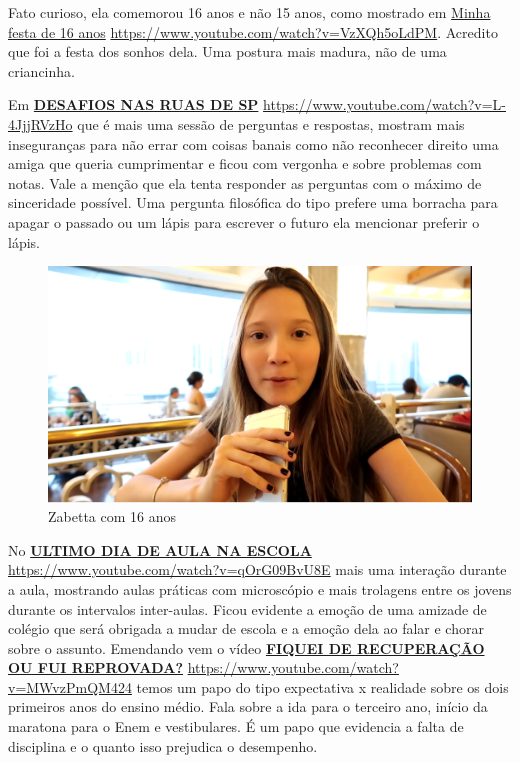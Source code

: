 Fato curioso, ela comemorou 16 anos e não 15 anos, como mostrado em \href{https://www.youtube.com/watch?v=VzXQh5oLdPM}{Minha festa de 16 anos} \url{https://www.youtube.com/watch?v=VzXQh5oLdPM}. Acredito que foi a festa dos sonhos dela. Uma postura mais madura, não de uma criancinha.

Em \href{https://www.youtube.com/watch?v=L-4JjjRVzHo}{\textbf{DESAFIOS NAS RUAS DE SP}} \url{https://www.youtube.com/watch?v=L-4JjjRVzHo} que é mais uma sessão de perguntas e respostas, mostram mais inseguranças para não errar com coisas banais como não reconhecer direito uma amiga que queria cumprimentar e ficou com vergonha e sobre problemas com notas. Vale a menção que ela tenta responder as perguntas com o máximo de sinceridade possível. Uma pergunta filosófica do tipo prefere uma borracha para apagar o passado ou um lápis para escrever o futuro ela mencionar preferir o lápis.

\begin{figure}[h!]
    \centering
    \includegraphics[width=0.7\linewidth]{fig/Zabetta-16-anos1}
    \caption{Zabetta com 16 anos}
    \label{fig:zabetta-16-anos1}
\end{figure}

No \href{https://www.youtube.com/watch?v=qOrG09BvU8E}{\textbf{ULTIMO DIA DE AULA NA ESCOLA}} \url{https://www.youtube.com/watch?v=qOrG09BvU8E} mais uma interação durante a aula, mostrando aulas práticas com microscópio e mais trolagens entre os jovens durante os intervalos inter-aulas. Ficou evidente a emoção de uma amizade de colégio que será obrigada a mudar de escola e a emoção dela ao falar e chorar sobre o assunto.
Emendando vem o vídeo \href{https://www.youtube.com/watch?v=MWvzPmQM424}{\textbf{FIQUEI DE RECUPERAÇÃO OU FUI REPROVADA?}} \url{https://www.youtube.com/watch?v=MWvzPmQM424} temos um papo do tipo expectativa x realidade sobre os dois primeiros anos do ensino médio. Fala sobre a ida para o terceiro ano, início da maratona para o Enem e vestibulares. É um papo que evidencia a falta de disciplina e o quanto isso prejudica o desempenho.

